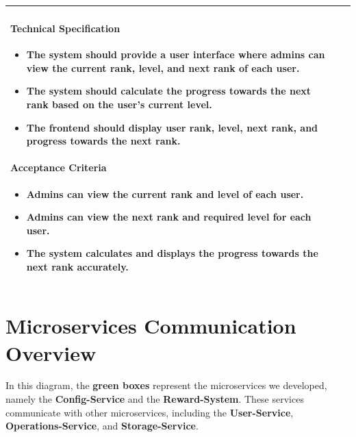 \begin{longtable}{ | m{} | m{} | }
    \paragraph*{Technical Specification} \mbox{} \newline
    \begin{itemize}
        \item The system should provide a user interface where admins can view the current rank, level, and next rank of each user.
        \item The system should calculate the progress towards the next rank based on the user's current level.
        \item The frontend should display user rank, level, next rank, and progress towards the next rank.
    \end{itemize}
    
    \paragraph*{Acceptance Criteria} \mbox{} \newline
    \begin{itemize}
        \item Admins can view the current rank and level of each user.
        \item Admins can view the next rank and required level for each user.
        \item The system calculates and displays the progress towards the next rank accurately.
    \end{itemize}                                                                                                                                                      \\
    \hline
\end{longtable}

\section{Microservices Communication Overview}
In this diagram, the \textbf{\textcolor[rgb]{0.0,0.5,0.0}{green boxes}} represent the microservices we developed, namely the \textbf{Config-Service} and the \textbf{Reward-System}. These services communicate with other microservices, including the \textbf{\textcolor[rgb]{0.0,0.0,0.5}{User-Service}}, \textbf{\textcolor[rgb]{0.0,0.0,0.5}{Operations-Service}}, and \textbf{\textcolor[rgb]{0.0,0.0,0.5}{Storage-Service}}.

